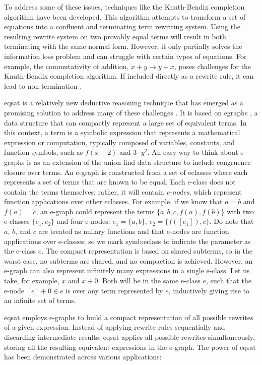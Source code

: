To address some of these issues, techniques like the Knuth-Bendix completion algorithm \cite{knuthbendixcompletion} have been developed. 
This algorithm attempts to transform a set of equations into a confluent and terminating term rewriting system. 
Using the resulting rewrite system on two provably equal terms will result in both terminating with the same normal form.
However, it only partially solves the information loss problem and can struggle with certain types of equations.
For example, the commutativity of addition, $x + y \rightarrow y + x$, poses challenges for the Knuth-Bendix completion algorithm. 
If included directly as a rewrite rule, it can lead to non-termination \cite{kapur1985knuthintro}.

\gls{eqsat} is a relatively new deductive reasoning technique that has emerged as a promising solution to address many of these challenges \cite{eqsat}. 
It is based on \gls{egraphs} \cite{egraphsnelson1980fast,egg}, a data structure that can compactly represent a large set of equivalent terms.
In this context, a term is a symbolic expression that represents a mathematical expression or computation, typically composed of variables, constants, and function symbols, such as  $f(x+2)$ and $3 \cdot y^2$.
An easy way to think about e-graphs is as an extension of the union-find data structure to include congruence closure over terms.
An e-graph is constructed from a set of \gls{eclasses} where each represents a set of terms that are known to be equal.
Each e-class does not contain the terms themselves; rather, it will contain \emph{e-nodes}, which represent function applications over other \gls{eclasses}.
For example, if we know that $a = b$ and $f(a) = c$, an e-graph could represent the terms $\{ a, b, c, f(a), f(b) \}$ with two e-classes $\{ e_1, e_2 \}$ and four e-nodes: $e_1  = \{a, b\}$, $e_2 = \{f([e_1]), c\}$.
Do note that $a$, $b$, and $c$ are treated as nullary functions and that e-nodes are function applications over e-classes, so we mark \gls{symb:eclass} to indicate the parameter as the e-class $e$.
The compact representation is based on shared subterms, so in the worst case, no subterms are shared, and no compaction is achieved.
However, an e-graph can also represent infinitely many expressions in a single e-class.
Let us take, for example, $x$ and $x + 0$.
Both will be in the same e-class $e$, such that the e-node $[e] + 0\in e$ is over any term represented by $e$, inductively giving rise to an infinite set of terms.

\gls{eqsat} employs e-graphs to build a compact representation of all possible rewrites of a given expression.
Instead of applying rewrite rules sequentially and discarding intermediate results, \gls{eqsat} applies all possible rewrites simultaneously, storing all the resulting equivalent expressions in the e-graph. 
The power of \gls{eqsat} has been demonstrated across various applications:

